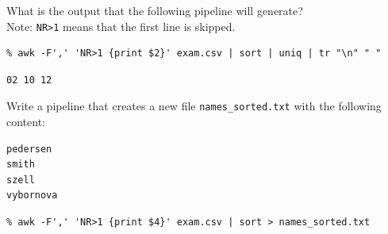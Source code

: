 \documentclass[addpoints,a4]{exam} %
\begin{document}
\begin{questions}
\begin{parts}
\begin{subparts}
\subpart[2] What is the output that the following pipeline will generate? \\Note: \verb+NR>1+ means that the first line is skipped.
\begin{verbatim}
% awk -F',' 'NR>1 {print $2}' exam.csv | sort | uniq | tr "\n" " "
\end{verbatim}
\begin{solution}[\stretch{1}]
\begin{verbatim}
02 10 12
\end{verbatim}
\end{solution}



\subpart[3]
Write a pipeline that creates a new file \verb+names_sorted.txt+ with the following content:
\end{subparts}
\begin{verbatim}
pedersen
smith
szell
vybornova
\end{verbatim}
\begin{solution}[\stretch{2}]
\begin{verbatim}
% awk -F',' 'NR>1 {print $4}' exam.csv | sort > names_sorted.txt
\end{verbatim}
\end{solution}
\end{parts}

\end{questions}
\end{document}
